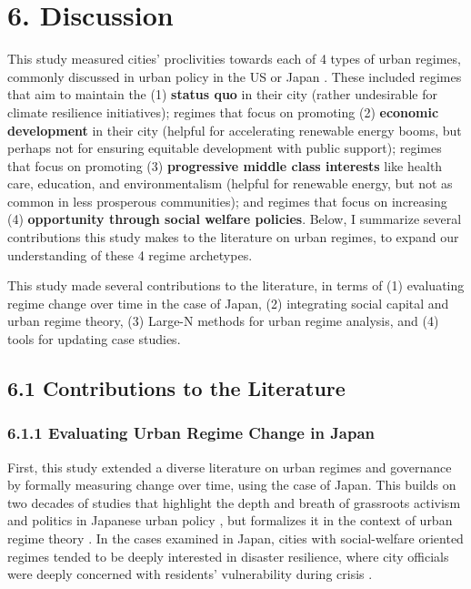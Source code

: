 \documentclass[preprint, 3p,
authoryear]{elsarticle} %
\begin{document}
\hypertarget{discussion}{%
\section{6. Discussion}\label{discussion}}

\doublespacing

This study measured cities' proclivities towards each of 4 types of
urban regimes, commonly discussed in urban policy in the US or Japan
\citep{stone_1989, stoker_and_mossberger_1994, bassett_1996, hill_fujita_2000, kilburn_2004, ramirez_perez_et_al_2008, sorensen_2011}.
These included regimes that aim to maintain the (1) \textbf{status quo}
in their city (rather undesirable for climate resilience initiatives);
regimes that focus on promoting (2) \textbf{economic development} in
their city (helpful for accelerating renewable energy booms, but perhaps
not for ensuring equitable development with public support); regimes
that focus on promoting (3) \textbf{progressive middle class interests}
like health care, education, and environmentalism (helpful for renewable
energy, but not as common in less prosperous communities); and regimes
that focus on increasing (4) \textbf{opportunity through social welfare
policies}. Below, I summarize several contributions this study makes to
the literature on urban regimes, to expand our understanding of these 4
regime archetypes.

This study made several contributions to the literature, in terms of (1)
evaluating regime change over time in the case of Japan, (2) integrating
social capital and urban regime theory, (3) Large-N methods for urban
regime analysis, and (4) tools for updating case studies.

\hypertarget{contributions-to-the-literature}{%
\subsection{6.1 Contributions to the
Literature}\label{contributions-to-the-literature}}

\hypertarget{evaluating-urban-regime-change-in-japan}{%
\subsubsection{6.1.1 Evaluating Urban Regime Change in
Japan}\label{evaluating-urban-regime-change-in-japan}}

First, this study extended a diverse literature on urban regimes and
governance by formally measuring change over time, using the case of
Japan. This builds on two decades of studies that highlight the depth
and breath of grassroots activism and politics in Japanese urban policy
\citep[eg.][]{leblanc_1999, funck_2007, leblanc_2009, avenell_2010, aldrich_and_fraser_2017},
but formalizes it in the context of urban regime theory
\citep{stone_1989}. In the cases examined in Japan, cities with
social-welfare oriented regimes tended to be deeply interested in
disaster resilience, where city officials were deeply concerned with
residents' vulnerability during crisis
\citep{maly_2012, aldrich_2012, dimmer_and_lindenberg_2014, matthews_2017, aldrich_2019, cheek_2020, ji_and_imai_2022, abeysinghe_2022}.
\end{document}
